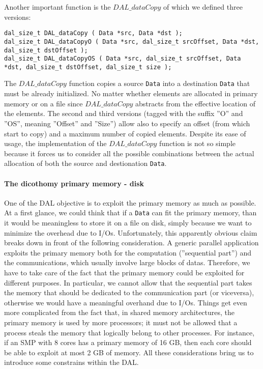 Another important function is the $DAL\_dataCopy$ of which we defined three versions:
\begin{lstlisting}
dal_size_t DAL_dataCopy ( Data *src, Data *dst ); 
dal_size_t DAL_dataCopyO ( Data *src, dal_size_t srcOffset, Data *dst, dal_size_t dstOffset ); 
dal_size_t DAL_dataCopyOS ( Data *src, dal_size_t srcOffset, Data *dst, dal_size_t dstOffset, dal_size_t size );
\end{lstlisting}
The $DAL\_dataCopy$ function copies a source \texttt{Data} into a destination \texttt{Data} that must be already initialized. No matter whether elements are allocated in primary memory or on a file since $DAL\_dataCopy$ abstracts from the effective location of the elements. The second and third versions (tagged with the suffix ''O'' and ''OS'', meaning ''Offset'' and ''Size'') allow also to specify an offset (from which start to copy) and a maximum number of copied elements. Despite its ease of usage, the implementation of  the $DAL\_dataCopy$ function is not so simple because it forces us to consider all the possible combinations between the actual allocation of both the source and destionation \texttt{Data}. 

\paragraph{The dicothomy primary memory - disk}
One of the DAL objective is to exploit the primary memory as much as possible. At a first glance, we could think that if a \texttt{Data} can fit the primary memory, than it would be meaningless to store it on a file on disk, simply because we want to minimize the overhead due to I/Os. Unfortunately, this apparently obvious claim breaks down in front of the following consideration. A generic parallel application exploits the primary memory both for the computation (''sequential part'') and the communications, which usually involve large blocks of datas. Therefore, we have to take care of the fact that the primary memory could be exploited for different purposes. In particular, we cannot allow that the sequential part takes the memory that should be dedicated to the communication part (or viceversa), otherwise we would have a meaningful overhand due to I/Os. Things get even more complicated from the fact that, in shared memory architectures, the primary memory is used by more processors; it must not be allowed that a process steals the memory that logically belong to other processes. For instance, if an SMP with 8 cores has a primary memory of 16 GB, then each core should be able to exploit at most 2 GB of memory. All these considerations bring us to introduce some constrains within the DAL. 

